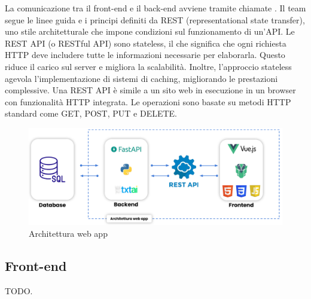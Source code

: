 \vspace{0.5\baselineskip}
\par La comunicazione tra il front-end e il back-end avviene tramite chiamate . Il team segue le linee guida e i principi definiti da REST (representational state transfer), uno stile architetturale che impone condizioni sul funzionamento di un'API. Le REST API (o RESTful API) sono stateless, il che significa che ogni richiesta HTTP deve includere tutte le informazioni necessarie per elaborarla. Questo riduce il carico sul server e migliora la scalabilità. Inoltre, l’approccio stateless agevola l'implementazione di sistemi di caching, migliorando le prestazioni complessive. Una REST API è simile a un sito web in esecuzione in un browser con funzionalità HTTP integrata. Le operazioni sono basate su metodi HTTP standard come GET, POST, PUT e DELETE.

\begin{figure}[H]
  \centering
  \includegraphics[width=\textwidth]{assets/architettura_web_app.pdf}
  \caption{Architettura web app}
\end{figure}

\subsection{Front-end}

\par TODO.

